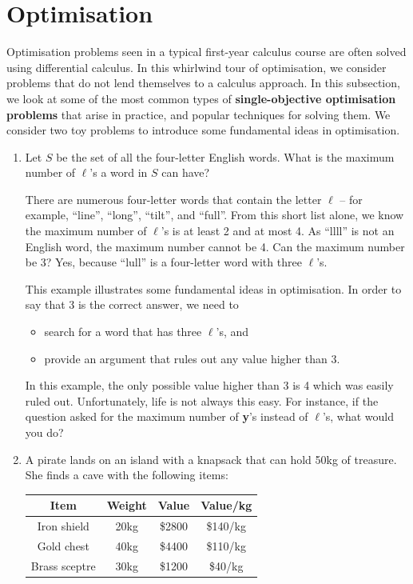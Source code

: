 \section{Optimisation}
Optimisation problems seen in a typical first-year calculus course are often solved using differential calculus. In this whirlwind tour of optimisation, we consider problems that do not lend themselves to a calculus approach. In this subsection, we look at some of the most common types of \textbf{single-objective optimisation problems} that arise in practice, and popular techniques for solving them.
\newl We consider two toy problems to introduce some fundamental ideas in
optimisation.

\begin{enumerate}
\def\labelenumi{\arabic{enumi}.}
\item
  Let \(S\) be the set of all the four-letter English words. What is the
  maximum number of \(\ell\)'s a word in \(S\) can have?

  There are numerous four-letter words that contain
  the letter \(\ell\) -- for example, ``line'', ``long'', ``tilt'', and
  ``full''. From this short list alone, we know the maximum number of
  \(\ell\)'s is at least 2 and at most 4. As ``llll'' is not an English
  word, the maximum number cannot be 4. Can the maximum number be 3?
  Yes, because ``lull'' is a four-letter word with three \(\ell\)'s.

  This example illustrates some fundamental ideas in optimisation. In order to say that 3 is the correct answer, we need to \begin{itemize}[noitemsep]
  \item search for a word
  that has three \(\ell\)'s, and 
  \item provide an argument that rules out any
  value higher than 3. \end{itemize}
  In this example, the only possible value higher
  than 3 is 4 which was easily ruled out. Unfortunately, life is not
  always this easy. For instance, if the question asked for the maximum
  number of \textbf{y}'s instead of \(\ell\)'s, what would you do?
\item
  A pirate lands on an island with a knapsack that can hold 50kg of treasure. She finds a cave with the following items:

  \begin{longtable}[]{@{}cccc@{}}
  \toprule
  Item & Weight & Value & Value/kg\tabularnewline
  \midrule
  \endhead
  Iron shield & 20kg & \$2800 & \$140/kg\tabularnewline
  Gold chest & 40kg & \$4400 & \$110/kg\tabularnewline
  Brass sceptre & 30kg & \$1200 & \$40/kg\tabularnewline
  \bottomrule
  \end{longtable}


\end{enumerate}
